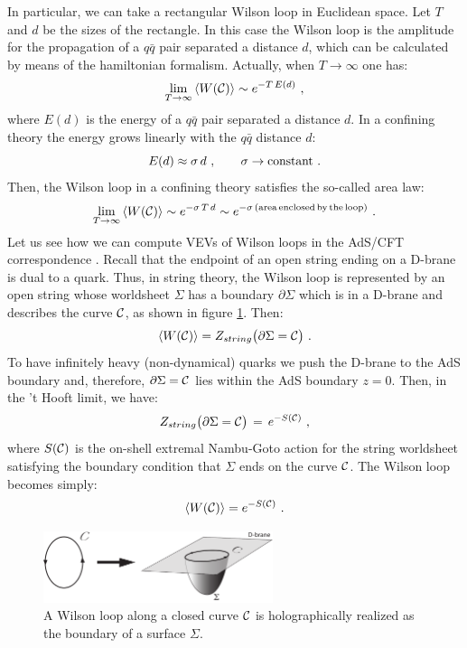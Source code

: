 \documentclass[12pt,notitlepage,a4paper]{article}
\newcommand{\beq}{\begin{equation}}
\newcommand{\eeq}{\end{equation}}
\begin{document}
In particular, we can take a rectangular Wilson loop in Euclidean space.  Let $T$ and $d$ be the sizes of the rectangle. In this case the Wilson loop is the amplitude for the propagation of a $q\bar q$ pair separated a distance $d$, which can be calculated by means of the hamiltonian formalism. Actually, when $T\to\infty$ one has:
\beq
\lim_{T\to\infty}\,\langle W({\cal C})\rangle\sim e^{-T\,E(d)}\,\,,
\eeq
where $E(d)$ is the energy of a $q\bar q$ pair separated a distance $d$. 
In a confining theory the energy grows linearly with the $q\bar q$ distance $d$:
\beq
E(d)\approx \sigma\, d\,\,,
\qquad
\sigma\to {\rm constant}\,\,.
\eeq
Then, the Wilson loop in a confining theory satisfies the so-called area law:
\beq
\lim_{T\to\infty}\,\langle W({\cal C})\rangle\sim e^{-\sigma\,T\,d}\sim 
e^{-\sigma\,({\rm area \,enclosed\, by \,the\, loop})}\,\,.
\eeq
Let us see how we can compute  VEVs of Wilson loops in the AdS/CFT correspondence \cite{Maldacena:1998im,Rey:1998ik}. Recall that the endpoint of an open string ending on a D-brane is dual to a quark. Thus, in string theory, the Wilson loop is represented by an open string whose worldsheet  $\Sigma$ has a boundary $\partial\Sigma$ which is in a D-brane and describes the curve ${\cal C}$, as shown in figure \ref{holoWilson}. Then:
\beq
\langle W({\cal C})\rangle=Z_{string} \big(\partial\Sigma={\cal C}\big)\,\,.
\eeq
To have infinitely heavy (non-dynamical) quarks we push the D-brane to the AdS boundary and, therefore, $\partial\Sigma={\cal C}$ lies within the AdS boundary $z=0$. Then,  in the 't Hooft limit, we have:
\beq
Z_{string} \big(\partial\Sigma={\cal C}\big)\,=\,e^{-S({\cal C})}\,\,,
\eeq
where $S({\cal C})$ is the on-shell extremal Nambu-Goto action for the string worldsheet satisfying the boundary condition that $\Sigma$  ends on the curve ${\cal C}$. The Wilson loop becomes simply:
\beq
\langle W({\cal C})\rangle=e^{-S({\cal C})}\,\,.
\eeq

\begin{figure}[ht]
\center
\includegraphics[width=0.6\textwidth]{WilsonLoop.pdf}
\qquad
\caption{A Wilson loop along a closed curve ${\cal C}$ is holographically realized as the boundary of a surface $\Sigma$.  } 
\label{holoWilson}
\end{figure}
\end{document}
